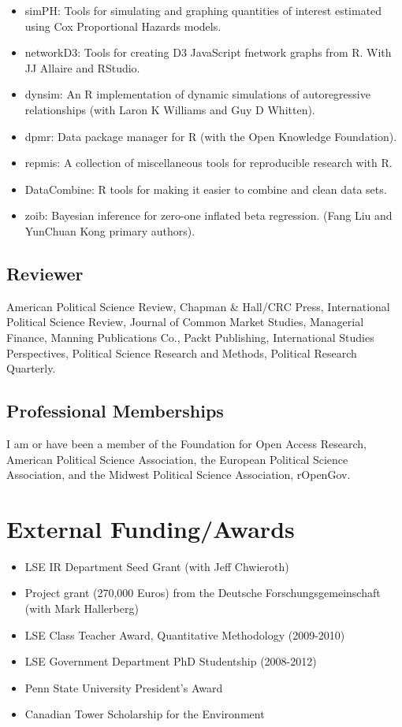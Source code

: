 \documentclass[a4paper]{article}
\begin{document}
{{\begin{itemize}
    \item simPH: Tools for simulating and graphing quantities of interest estimated using Cox Proportional Hazards models.
    \item networkD3: Tools for creating D3 JavaScript fnetwork graphs from R. With JJ Allaire and RStudio.
    \item dynsim: An R implementation of dynamic simulations of autoregressive relationships (with Laron K Williams and Guy D Whitten).
    \item dpmr: Data package manager for R (with the Open Knowledge Foundation).
    \item repmis: A collection of miscellaneous tools for reproducible research with R.
    \item DataCombine: R tools for making it easier to combine and clean data sets.
    \item zoib: Bayesian inference for zero-one inflated beta regression. (Fang Liu and YunChuan Kong primary authors).
\end{itemize}

\subsection*{Reviewer}

 American Political Science Review, Chapman \& Hall/CRC Press, International Political Science Review, Journal of Common Market Studies, Managerial Finance, Manning Publications Co., Packt Publishing, International Studies Perspectives, Political Science Research and Methods, Political Research Quarterly.

\subsection*{Professional Memberships}

I am or have been a member of the Foundation for Open Access Research, American Political Science Association, the European Political Science Association, and the Midwest Political Science Association, rOpenGov.

\section*{External Funding/Awards}

\begin{itemize}

    \item LSE IR Department Seed Grant (with Jeff Chwieroth)
    \item Project grant (270,000 Euros) from the Deutsche Forschungsgemeinschaft (with Mark Hallerberg)
    \item LSE Class Teacher Award, Quantitative Methodology (2009-2010)
    \item LSE Government Department PhD Studentship (2008-2012)
    \item Penn State University President's Award
    \item Canadian Tower Scholarship for the Environment


\end{itemize}}}
\end{document}
